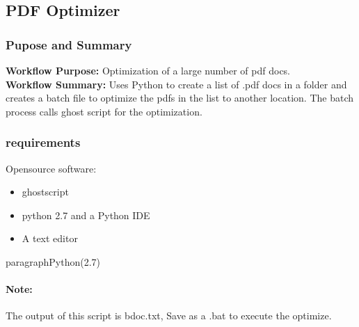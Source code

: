 %
%
%
%
% 
\subsection{PDF Optimizer}
\subsubsection{Pupose and Summary}
\textbf{Workflow Purpose:} Optimization of a large number of pdf docs.\\
\textbf{Workflow Summary:} Uses Python to create a list of .pdf docs in a folder and creates a batch file to optimize the pdfs in the list to another location.  The batch process calls ghost script for the optimization.

\subsubsection{requirements}
Opensource software:
\begin{itemize}
\item ghostscript
\item python 2.7 and a Python IDE
\item A text editor
\end{itemize}
paragraph{Python(2.7)}

\paragraph*{Note:} The output of this script is bdoc.txt, Save as a .bat to execute the optimize.


